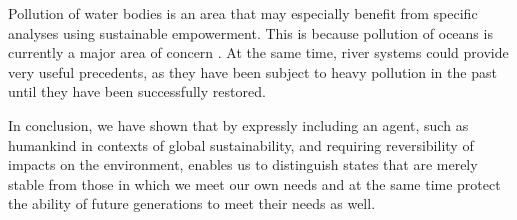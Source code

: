 \documentclass[conference]{IEEEtran}
\begin{document}
Pollution of water bodies is an area that may especially benefit from
specific analyses using sustainable empowerment. This is because
pollution of oceans is currently a major area of concern \cite{}. At
the same time, river systems could provide very useful precedents, as
they have been subject to heavy pollution in the past until they have
been successfully restored.

In conclusion, we have shown that by expressly including an agent,
such as humankind in contexts of global sustainability, and requiring
reversibility of impacts on the environment, enables us to distinguish
states that are merely stable from those in which we meet our own
needs and at the same time protect the ability of future generations
to meet their needs as well.













\end{document}
